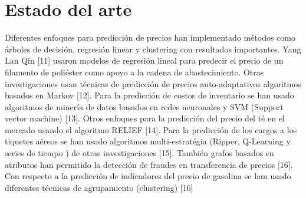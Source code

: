 \section{Estado del arte} 
Diferentes enfoques para  predicción de precios han implementado métodos como  árboles de decisión, regresión linear y clustering con resultados importantes.  Yang Lan Qin [11] usaron modelos de regresión lineal para predecir el precio de un filamento de poliéster como apoyo a la cadena de abastecimiento. Otras investigaciones usan técnicas de predicción de precios auto-adaptativos  algoritmos basados en Markov [12]. Para la predicción de costos de inventario se han usado algoritmos de minería de datos basados en redes neuronales y SVM (Support vector machine) [13]. Otros enfoques para la predicción del precio del té en el mercado usando el algoritmo RELIEF [14]. Para la predicción de los cargos a los tiquetes aéreos se han usado algoritmos multi-estratégia (Ripper, Q-Learning y series de tiempo ) de otras investigaciones [15]. También grafos basados en atributos han permitido la detección de fraudes en transferencia de precios  [16]. Con respecto a la predicción de indicadores del precio de gasolina se han usado diferentes técnicas de agrupamiento (clustering) [16] 
